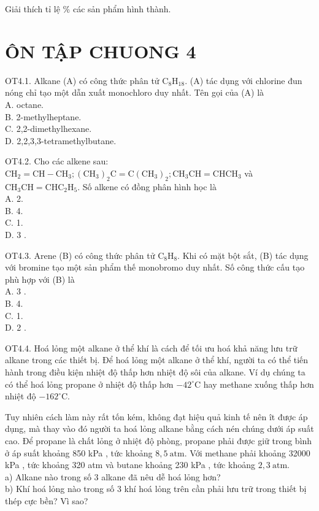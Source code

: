 \documentclass[10pt]{article}
\begin{document}
Giải thích tỉ lệ \% các sản phẩm hình thành.

\section*{ÔN TẬP CHUONG 4}
OT4.1. Alkane (A) có công thức phân tử $\mathrm{C}_{8} \mathrm{H}_{18}$. (A) tác dụng với chlorine đun nóng chỉ tạo một dẫn xuất monochloro duy nhất. Tên gọi của (A) là\\
A. octane.\\
B. 2-methylheptane.\\
C. 2,2-dimethylhexane.\\
D. 2,2,3,3-tetramethylbutane.

OT4.2. Cho các alkene sau: $\mathrm{CH}_{2}=\mathrm{CH}-\mathrm{CH}_{3} ;\left(\mathrm{CH}_{3}\right)_{2} \mathrm{C}=\mathrm{C}\left(\mathrm{CH}_{3}\right)_{2} ; \mathrm{CH}_{3} \mathrm{CH}=\mathrm{CHCH}_{3}$ và $\mathrm{CH}_{3} \mathrm{CH}=\mathrm{CHC}_{2} \mathrm{H}_{5}$. Số alkene có đồng phân hình học là\\
A. 2.\\
B. 4.\\
C. 1.\\
D. 3 .

OT4.3. Arene (B) có công thức phân tử $\mathrm{C}_{8} \mathrm{H}_{8}$. Khi có mặt bột sắt, (B) tác dụng với bromine tạo một sản phẩm thế monobromo duy nhất. Số công thức cấu tạo phù hợp với (B) là\\
A. 3 .\\
B. 4.\\
C. 1.\\
D. 2 .

OT4.4. Hoá lỏng một alkane ở thể khí là cách để tối ưu hoá khả năng lưu trữ alkane trong các thiết bị. Để hoá lỏng một alkane ở thể khí, người ta có thể tiến hành trong điều kiện nhiệt độ thấp hơn nhiệt độ sôi của alkane. Ví dụ chúng ta có thể hoá lỏng propane ở nhiệt độ thấp hơn $-42^{\circ} \mathrm{C}$ hay methane xuống thấp hơn nhiệt độ $-162^{\circ} \mathrm{C}$.

Tuy nhiên cách làm này rất tốn kém, không đạt hiệu quả kinh tế nên ît được áp dụng, mà thay vào đó người ta hoá lỏng alkane bằng cách nén chúng dưới áp suất cao. Để propane là chất lỏng ở nhiệt độ phòng, propane phải được giữ trong bình ở áp suất khoảng 850 kPa , tức khoảng $8,5 \mathrm{~atm}$. Với methane phải khoảng 32000 kPa , tức khoảng 320 atm và butane khoảng 230 kPa , tức khoảng $2,3 \mathrm{~atm}$.\\
a) Alkane nào trong số 3 alkane đã nêu dễ hoá lỏng hơn?\\
b) Khí hoá lỏng nào trong số 3 khí hoá lỏng trên cần phải lưu trữ trong thiết bị thép cực bền? Vì sao?
\end{document}
